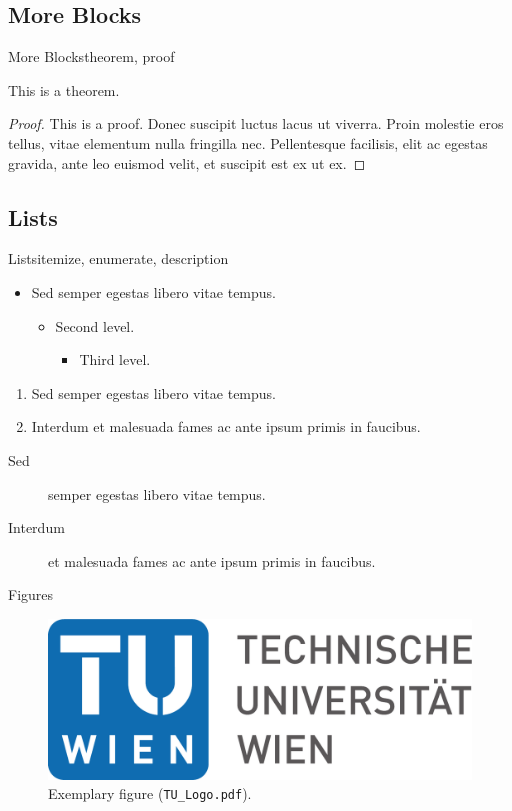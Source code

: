 \documentclass{beamer}
\begin{document}
\subsection{More Blocks}
\begin{frame}{More Blocks}{theorem, proof}
  \begin{theorem}
    This is a theorem.
  \end{theorem}
  \begin{proof}
    This is a proof.  Donec suscipit luctus lacus ut viverra. Proin molestie
    eros tellus, vitae elementum nulla fringilla nec. Pellentesque facilisis,
    elit ac egestas gravida, ante leo euismod velit, et suscipit est ex ut ex.
  \end{proof}
\end{frame}

\subsection{Lists}
\begin{frame}{Lists}{itemize, enumerate, description}
  \begin{itemize}
  \item Sed semper egestas libero vitae tempus.
    \begin{itemize}
    \item Second level.
      \begin{itemize}
      \item Third level.
      \end{itemize}
    \end{itemize}
  \end{itemize}

  \begin{enumerate}
  \item Sed semper egestas libero vitae tempus.
  \item Interdum et malesuada fames ac ante ipsum primis in faucibus.
  \end{enumerate}

  \begin{description}
  \item[Sed] semper egestas libero vitae tempus.
  \item[Interdum] et malesuada fames ac ante ipsum primis in faucibus.
  \end{description}
\end{frame}

\begin{frame}{Figures}{}
  \begin{figure}
    \centering
    \includegraphics[width=0.8\linewidth]{TU_Logo}
    \caption{Exemplary figure (\texttt{TU\_Logo.pdf}).}
    \label{fig:test}
  \end{figure}
\end{frame}
\end{document}
